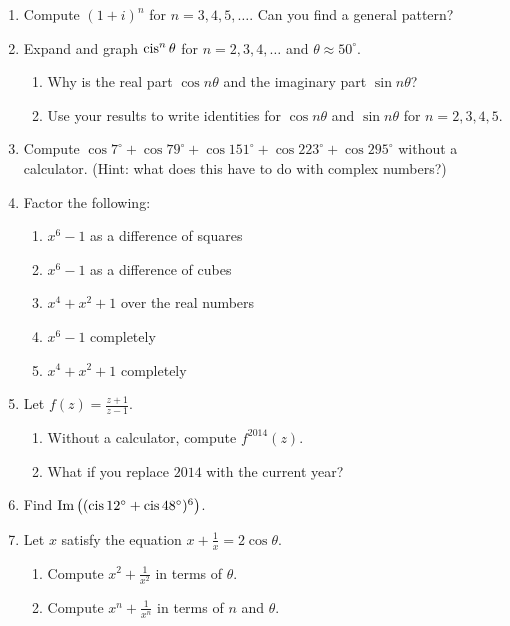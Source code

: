 \documentclass[../gatm.tex]{subfiles}
\begin{document}
\begin{enumerate}
\item Compute $(1+i)^n$ for $n=3,4,5,\ldots$. Can you find a general pattern?
\item Expand and graph $\operatorname{cis}^n \theta$ for $n=2,3,4,\ldots$ and $\theta\approx 50^\circ$.

\begin{enumerate}
\item Why is the real part $\cos n\theta$ and the imaginary part $\sin n\theta$?
\item Use your results to write identities for $\cos n\theta$ and $\sin n\theta$ for $n=2,3,4,5$.
\end{enumerate}

\newcommand{\cosdeg}[1] {\cos #1^\circ}

\item Compute $\cosdeg{7} + \cosdeg{79} + \cosdeg{151} + \cosdeg{223} + \cosdeg{295}$ without a calculator. (Hint: what does this have to do with complex numbers?)
\item Factor the following:
\begin{multicols}{2}
\begin{enumerate}
\item $x^6-1$ as a difference of squares
\item $x^6-1$ as a difference of cubes
\item $x^4+x^2+1$ over the real numbers
\item $x^6-1$ completely
\item $x^4+x^2+1$ completely
\end{enumerate}
\end{multicols}

\item Let $f(z)=\frac{z+1}{z-1}$.
\begin{enumerate}
\item Without a calculator, compute $f^{2014}(z)$.
\item What if you replace $2014$ with the current year?
\end{enumerate}

\item Find $\operatorname{Im}\left((\operatorname{cis} 12^\circ + \operatorname{cis} 48^\circ)^6\right)$.

\item Let $x$ satisfy the equation $x+\frac{1}{x}=2\cos\theta$.
\begin{enumerate}
\item Compute $x^2+\frac{1}{x^2}$ in terms of $\theta$.
\item Compute $x^n+\frac{1}{x^n}$ in terms of $n$ and $\theta$.
\end{enumerate}
\end{enumerate}
\end{document}
